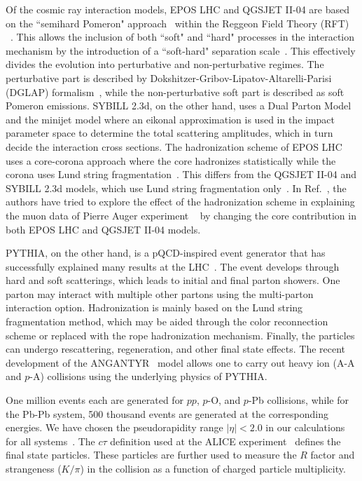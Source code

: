 \documentclass[aps,twocolumn,nofootinbib]{revtex4-1}
\begin{document}
Of the cosmic ray interaction models, EPOS LHC and QGSJET II-04 are based on the ``semihard Pomeron" approach~\cite{Drescher:1999zy,Ostapchenko:2001hz,Drescher:2000ha} within the Reggeon Field Theory (RFT) ~\cite{Gribov1968}. This allows the inclusion of both ``soft" and ``hard" processes in the interaction mechanism by the introduction of a ``soft-hard" separation scale~\cite{Ostapchenko:2016dxc}. This effectively divides the evolution into perturbative and non-perturbative regimes. The perturbative part is described by Dokshitzer-Gribov-Lipatov-Altarelli-Parisi (DGLAP) formalism~\cite{Gribov:1972ri,Dokshitzer:1977sg,Altarelli:1977zs}, while the non-perturbative soft part is described as soft Pomeron emissions. SYBILL 2.3d, on the other hand, uses a Dual Parton Model and the minijet model where an eikonal approximation is used in the impact parameter space to determine the total scattering amplitudes, which in turn decide the interaction cross sections. The hadronization scheme of EPOS LHC uses a core-corona approach where the core hadronizes statistically while the corona uses Lund string fragmentation~\cite{Pierog:2013ria,Andersson:1983jt}. This differs from the QGSJET II-04 and SYBILL 2.3d models, which use Lund string fragmentation only~\cite{Ostapchenko:2010vb,Riehn:2019jet}. In Ref.~\cite{Baur:2019cpv}, the authors have tried to explore the effect of the hadronization scheme in explaining the muon data of Pierre Auger experiment ~\cite{PierreAuger:2014ucz} by changing the core contribution in both EPOS LHC and QGSJET II-04 models.

PYTHIA, on the other hand, is a pQCD-inspired event generator that has successfully explained many results at the LHC~\cite{Bierlich:2022pfr}. The event develops through hard and soft scatterings, which leads to initial and final parton showers. One parton may interact with multiple other partons using the multi-parton interaction option. Hadronization is mainly based on the Lund string fragmentation method, which may be aided through the color reconnection scheme or replaced with the rope hadronization mechanism. Finally, the particles can undergo rescattering, regeneration, and other final state effects. The recent development of the ANGANTYR~\cite{Bierlich:2018xfw} model allows one to carry out heavy ion (A-A and $p$-A) collisions using the underlying physics of PYTHIA.

One million events each are generated for $pp$, $p$-O, and $p$-Pb collisions, while for the Pb-Pb system, 500 thousand events are generated at the corresponding energies. We have chosen the pseudorapidity range $|\eta|<2.0$ in our calculations for all systems~\cite{ALICE:2017pcy}. The $c\tau$ definition used at the ALICE experiment~\cite{ALICE:2017pcy} defines the final state particles. These particles are further used to measure the $R$ factor and strangeness ($K/\pi$) in the collision as a function of charged particle multiplicity. 
\end{document}
